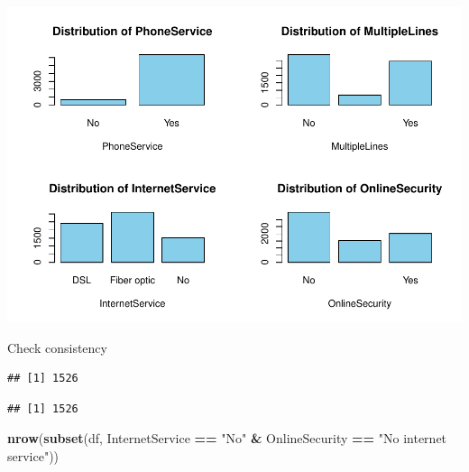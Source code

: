 \documentclass[
  twoside]{article}
\newenvironment{Shaded}{\begin{snugshade}}{\end{snugshade}}
\newcommand{\FunctionTok}[1]{\textcolor[rgb]{0.13,0.29,0.53}{\textbf{#1}}}
\newcommand{\NormalTok}[1]{#1}
\newcommand{\SpecialCharTok}[1]{\textcolor[rgb]{0.81,0.36,0.00}{\textbf{#1}}}
\newcommand{\StringTok}[1]{\textcolor[rgb]{0.31,0.60,0.02}{#1}}
\begin{document}
\includegraphics{Assigment2_files/figure-latex/unnamed-chunk-16-1.pdf}

Check consistency

\begin{Shaded}
\end{Shaded}

\begin{verbatim}
## [1] 1526
\end{verbatim}

\begin{Shaded}
\end{Shaded}

\begin{verbatim}
## [1] 1526
\end{verbatim}

\begin{Shaded}
\begin{Highlighting}[]
\FunctionTok{nrow}\NormalTok{(}\FunctionTok{subset}\NormalTok{(df, InternetService }\SpecialCharTok{==} \StringTok{"No"} \SpecialCharTok{\&}\NormalTok{ OnlineSecurity }\SpecialCharTok{==} \StringTok{"No internet service"}\NormalTok{))}
\end{Highlighting}
\end{Shaded}
\end{document}
